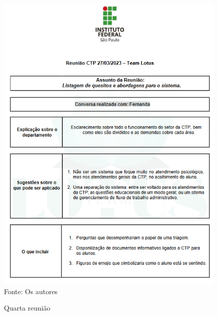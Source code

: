\documentclass[12pt,a4paper]{article}
\begin{document}
\begin{figure}[H]
    \centering
    \caption{Quarta reunião}
     \includegraphics[width=15cm]{ilus4.png}
     Fonte: Os autores
     \label{fig}
\end{figure}
\end{document}
